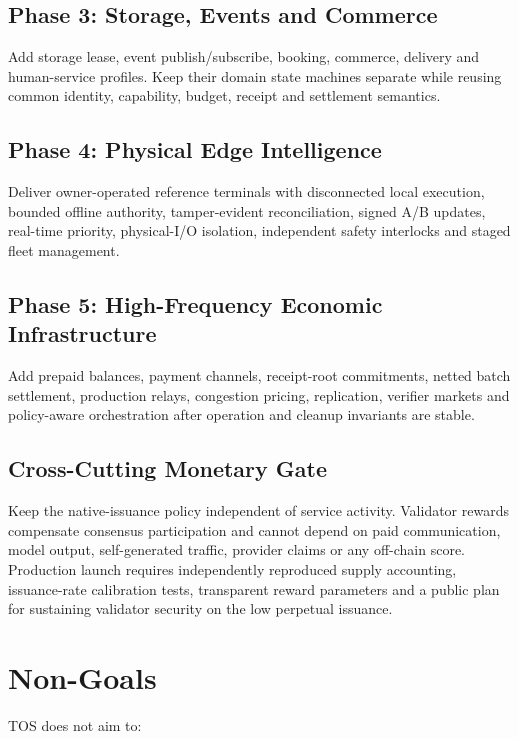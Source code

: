\documentclass[11pt,oneside]{article}
\begin{document}
\subsection{Phase 3: Storage, Events and Commerce}

Add storage lease, event publish/subscribe, booking, commerce, delivery and human-service
profiles. Keep their domain state machines separate while reusing common identity,
capability, budget, receipt and settlement semantics.

\subsection{Phase 4: Physical Edge Intelligence}

Deliver owner-operated reference terminals with disconnected local execution, bounded offline
authority, tamper-evident reconciliation, signed A/B updates, real-time priority, physical-I/O
isolation, independent safety interlocks and staged fleet management.

\subsection{Phase 5: High-Frequency Economic Infrastructure}

Add prepaid balances, payment channels, receipt-root commitments, netted batch settlement,
production relays, congestion pricing, replication, verifier markets and policy-aware
orchestration after operation and cleanup invariants are stable.

\subsection{Cross-Cutting Monetary Gate}

Keep the native-issuance policy independent of service activity. Validator rewards compensate
consensus participation and cannot depend on paid communication, model output, self-generated
traffic, provider claims or any off-chain score. Production launch requires independently
reproduced supply accounting, issuance-rate calibration tests, transparent reward parameters
and a public plan for sustaining validator security on the low perpetual issuance.

\section{Non-Goals}

TOS does not aim to:
\end{document}
